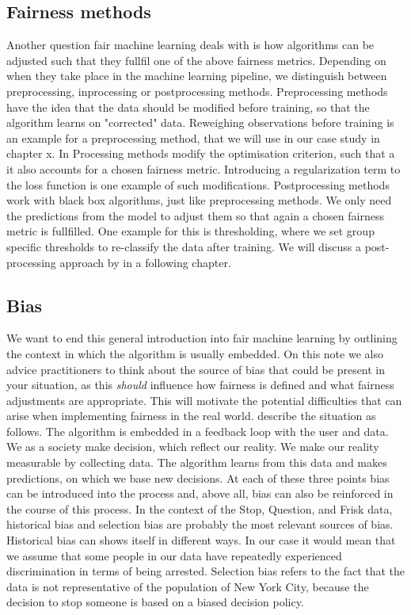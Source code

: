 \subsection*{Fairness methods}
Another question fair machine learning deals with is how algorithms can be adjusted such that they fullfil one of the above fairness metrics.
Depending on when they take place in the machine learning pipeline, we distinguish between preprocessing, inprocessing or postprocessing methods.
Preprocessing methods have the idea that the data should be modified before training, so that the algorithm learns on "corrected" data. Reweighing observations before training is an example for a preprocessing method, that we will use in our case study in chapter x.
In Processing methods modify the optimisation criterion, such that a it also accounts for a chosen fairness metric. Introducing a regularization term to the loss function is one example of such modifications.
Postprocessing methods work with black box algorithms, just like preprocessing methods. We only need the predictions from the model to adjust them so that again a chosen fairness metric is fullfilled. One example for this is thresholding, where we set group specific thresholds to re-classify the data after training. We will discuss a post-processing approach by \cite{hardt2016} in a following chapter.

\subsection*{Bias}
We want to end this general introduction into fair machine learning by outlining the context in which the algorithm is usually embedded. On this note we also advice practitioners to think about the source of bias that could be present in your situation, as this \textit{should} influence how fairness is defined and what fairness adjustments are appropriate. This will motivate the potential difficulties that can arise when implementing fairness in the real world.
\cite{caton2024} describe the situation as follows. The algorithm is embedded in a feedback loop with the user and data.
We as a society make decision, which reflect our reality. We make our reality measurable by collecting data. The algorithm learns from this data and makes predictions, on which we base new decisions. 
At each of these three points bias can be introduced into the process and, above all, bias can also be reinforced in the course of this process.
In the context of the Stop, Question, and Frisk data, historical bias and selection bias are probably the most relevant sources of bias.
Historical bias can shows itself in different ways. In our case it would mean that we assume that some people in our data have repeatedly experienced discrimination in terms of being arrested.
Selection bias refers to the fact that the data is not representative of the population of New York City, because the decision to stop someone is based on a biased decision policy.




